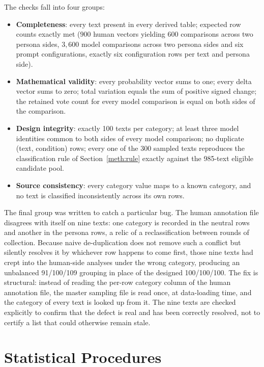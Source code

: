 The checks fall into four groups:

\begin{itemize}
    \item \textbf{Completeness}: every text present in every derived table; expected row counts
    exactly met ($900$ human vectors yielding $600$ comparisons across two persona sides,
    $3{,}600$ model comparisons
    across two persona sides and six prompt configurations, exactly six configuration rows per
    text and persona side).

    \item \textbf{Mathematical validity}: every probability vector sums to one; every delta
    vector sums to zero; total variation equals the sum of positive signed change; the retained
    vote count for every model comparison is equal on both sides of the comparison.

    \item \textbf{Design integrity}: exactly 100 texts per category; at least three model
    identities common to both sides of every model comparison; no duplicate (text, condition) rows;
    every one of the 300 sampled texts reproduces the classification rule of
    Section~\ref{meth:rule} exactly against the 985-text eligible candidate pool.

    \item \textbf{Source consistency}: every category value maps to a known category, and no
    text is classified inconsistently across its own rows.
\end{itemize}

\noindent
The final group was written to catch a particular bug. The human annotation file disagrees with
itself on nine texts: one category is recorded in the neutral rows and another in the persona
rows, a relic of a reclassification between rounds of collection. Because naive de-duplication
does not remove such a conflict but silently resolves it by whichever row happens to come first,
those nine texts had crept into the human-side analyses under the wrong category, producing an
unbalanced 91/100/109 grouping in place of the designed 100/100/100. The fix is structural: instead of reading the per-row category column of the human annotation file,
the master sampling file is read once, at data-loading time, and the category of every text is
looked up from it. The nine texts are checked explicitly to confirm that the defect is real and has
been correctly resolved, not to certify a list that could otherwise remain stale.

\section{Statistical Procedures}
\label{impl:stats}

